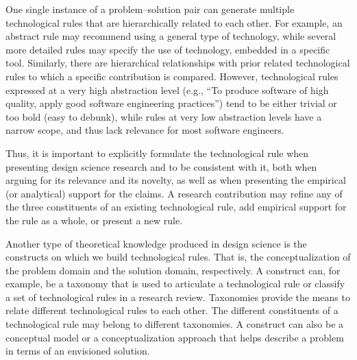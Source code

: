 \documentclass[graybox]{svmult}
\newcommand{\peggy}[1]{\textcolor{blue}{{\it [Peggy says: #1]}}}
\newcommand{\per}[1]{\textcolor{cyan}{{\it [Per says: #1]}}}
\newcommand{\peggy}[1]{}
\newcommand{\per}[1]{}
\begin{document}
One single instance of a problem--solution pair can generate multiple technological rules that are hierarchically related to each other. For example, an abstract rule may recommend using a general type of technology, while several more detailed rules may specify the use of technology, embedded in a specific tool. Similarly, there are hierarchical relationships with prior related technological rules to which a specific contribution is compared.
However, technological rules expressed at a very high abstraction level (e.g., ``To produce software of high quality, apply good software engineering practices'') tend to be either trivial or too bold (easy to debunk), while rules at very low abstraction levels have a narrow scope, and thus lack relevance for most software engineers. 

Thus, it is important to explicitly formulate the technological rule when presenting design science research and to be consistent with it, both when arguing for its relevance and its novelty, as well as when presenting the empirical (or analytical) support for the claims. A research contribution may refine any of the three constituents of an existing technological rule, add empirical support for the rule as a whole, or present a new rule.




Another type of theoretical knowledge produced in design science is the 
constructs on which we build technological rules. That is, the conceptualization of the problem domain and the solution domain, respectively.  
A construct can, for example, be a taxonomy that is used to articulate a technological rule or classify a set of technological rules in a research review. 
Taxonomies provide the means to relate different technological rules to each other. The different constituents of a technological rule may belong to different taxonomies. A construct can also be a conceptual model or a conceptualization approach that helps describe a problem in terms of an envisioned solution.
\end{document}
